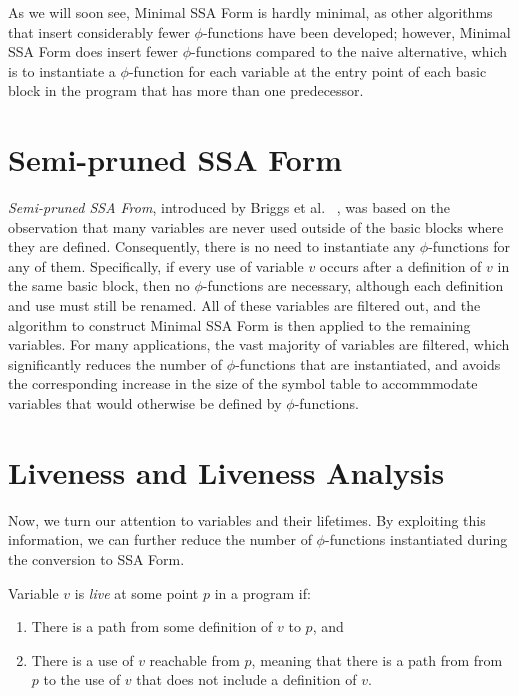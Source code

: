 As we will soon see, Minimal SSA Form is hardly minimal, as
other algorithms that insert considerably fewer $\phi$-functions
have been developed; however, Minimal SSA Form does insert
fewer $\phi$-functions compared to the naive alternative,
which is to instantiate a $\phi$-function for each variable
at the entry point of each basic block in the program that
has more than one predecessor. 

\section{Semi-pruned SSA Form}

\emph{Semi-pruned SSA From}, introduced by Briggs et al.
~\cite{BriggsJul98}, was based on the observation that
many variables are never used outside of the basic blocks
where they are defined. Consequently, there is no need 
to instantiate any $\phi$-functions for any of them. 
Specifically, if every use of variable $v$ occurs after
a definition of $v$ in the same basic block, then no
$\phi$-functions are necessary, although each definition
and use must still be renamed. All of these variables
are filtered out, and the algorithm to construct
Minimal SSA Form is then applied to the remaining 
variables. For many applications, the vast majority 
of variables are filtered, which significantly reduces
the number of $\phi$-functions that are instantiated,
and avoids the corresponding increase in the size of the
symbol table to accommmodate variables that would otherwise
be defined by $\phi$-functions. 


\section{Liveness and Liveness Analysis}

Now, we turn our attention to variables and their lifetimes. By
exploiting this information, we can further reduce the 
number of $\phi$-functions instantiated during the conversion
to SSA Form. 

Variable $v$ is \emph{live} at some point $p$ in a program if:
\begin{enumerate}
\item There is a path from some definition of $v$ to $p$, and
\item There is a use of $v$ reachable from $p$, meaning that
there is a path from from $p$ to the use of $v$ that does not
include a definition of $v$. 
\end{enumerate}


